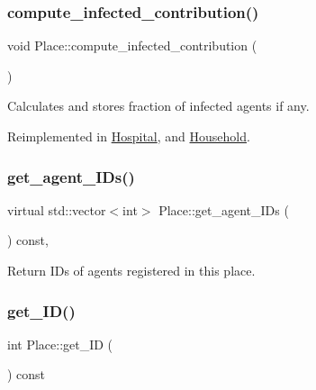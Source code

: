 \mbox{\label{classPlace_aeb4c561e8bc4e1ae7186baed6ef1aa47}} 
\subsubsection{\texorpdfstring{compute\+\_\+infected\+\_\+contribution()}{compute\_infected\_contribution()}}
{\footnotesize\ttfamily void Place\+::compute\+\_\+infected\+\_\+contribution (\begin{DoxyParamCaption}{ }\end{DoxyParamCaption})\hspace{0.3cm}{\ttfamily [virtual]}}



Calculates and stores fraction of infected agents if any. 



Reimplemented in \hyperlink{classHospital_ad87fc4a53e50a35489c9024892a7c9d6}{Hospital}, and \hyperlink{classHousehold_ae063737d06a7a50aa9b780d7066c1c88}{Household}.

\mbox{\label{classPlace_a2f6dbc1e8937c6563b04bbf7dde7e00f}} 
\subsubsection{\texorpdfstring{get\+\_\+agent\+\_\+\+I\+Ds()}{get\_agent\_IDs()}}
{\footnotesize\ttfamily virtual std\+::vector$<$int$>$ Place\+::get\+\_\+agent\+\_\+\+I\+Ds (\begin{DoxyParamCaption}{ }\end{DoxyParamCaption}) const\hspace{0.3cm}{\ttfamily [inline]}, {\ttfamily [virtual]}}



Return I\+Ds of agents registered in this place. 

\mbox{\label{classPlace_aec0a7e93c669c5e1f72435e2f9052011}} 
\subsubsection{\texorpdfstring{get\+\_\+\+I\+D()}{get\_ID()}}
{\footnotesize\ttfamily int Place\+::get\+\_\+\+ID (\begin{DoxyParamCaption}{ }\end{DoxyParamCaption}) const\hspace{0.3cm}{\ttfamily [inline]}}



